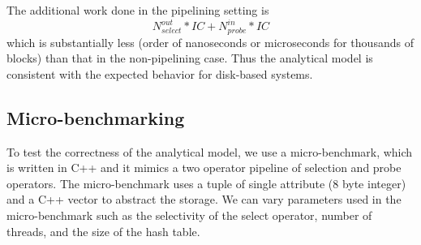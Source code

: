 The additional work done in the pipelining setting is 
\begin{equation*}
N^{out}_{select} * IC + N^{in}_{probe} * IC
\end{equation*}
which is substantially less (order of nanoseconds or microseconds for thousands of blocks) than that in the non-pipelining case.
Thus the analytical model is consistent with the expected behavior for disk-based systems. 

\subsection{Micro-benchmarking}
To test the correctness of the analytical model, we use a micro-benchmark, which is written in C++ and it mimics a two operator pipeline of selection and probe operators. 
The micro-benchmark uses a tuple of single attribute (8 byte integer) and a C++ vector to abstract the storage.
We can vary parameters used in the micro-benchmark such as the selectivity of the select operator, number of threads, and the size of the hash table.

